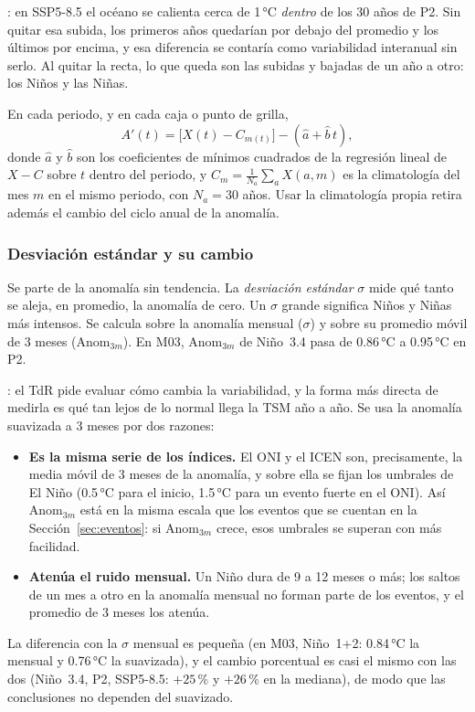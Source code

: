 \documentclass[11pt,a4paper]{article}
\begin{document}
: en SSP5-8.5 el océano se calienta cerca de 1\,°C \emph{dentro} de los 30 años de P2.
Sin quitar esa subida, los primeros años quedarían por debajo del promedio y los últimos por encima, y esa diferencia se contaría como variabilidad interanual sin serlo.
Al quitar la recta, lo que queda son las subidas y bajadas de un año a otro: los Niños y las Niñas.

En cada periodo, y en cada caja o punto de grilla,
\begin{equation}
\label{eq:anom_det}
A'(t) = \big[X(t) - C_{m(t)}\big] - (\hat a + \hat b\,t),
\end{equation}
donde $\hat a$ y $\hat b$ son los coeficientes de mínimos cuadrados de la regresión lineal de $X - C$ sobre $t$ dentro del periodo, y $C_m = \tfrac{1}{N_a}\sum_a X(a,m)$ es la climatología del mes $m$ en el mismo periodo, con $N_a = 30$ años.
Usar la climatología propia retira además el cambio del ciclo anual de la anomalía.

\subsubsection{Desviación estándar y su cambio}

Se parte de la anomalía sin tendencia.
La \emph{desviación estándar} $\sigma$ mide qué tanto se aleja, en promedio, la anomalía de cero.
Un $\sigma$ grande significa Niños y Niñas más intensos.
Se calcula sobre la anomalía mensual ($\sigma$) y sobre su promedio móvil de 3 meses ($\mathrm{Anom}_{3m}$).
En M03, $\mathrm{Anom}_{3m}$ de Niño~3.4 pasa de 0.86\,°C a 0.95\,°C en P2.

: el TdR pide evaluar cómo cambia la variabilidad, y la forma más directa de medirla es qué tan lejos de lo normal llega la TSM año a año.
Se usa la anomalía suavizada a 3 meses por dos razones:
\begin{itemize}[nosep,leftmargin=*]
\item \textbf{Es la misma serie de los índices.} El ONI y el ICEN son, precisamente, la media móvil de 3 meses de la anomalía, y sobre ella se fijan los umbrales de El Niño (0.5\,°C para el inicio, 1.5\,°C para un evento fuerte en el ONI).
Así $\mathrm{Anom}_{3m}$ está en la misma escala que los eventos que se cuentan en la Sección~\ref{sec:eventos}: si $\mathrm{Anom}_{3m}$ crece, esos umbrales se superan con más facilidad.
\item \textbf{Atenúa el ruido mensual.} Un Niño dura de 9 a 12 meses o más; los saltos de un mes a otro en la anomalía mensual no forman parte de los eventos, y el promedio de 3 meses los atenúa.
\end{itemize}
La diferencia con la $\sigma$ mensual es pequeña (en M03, Niño~1+2: 0.84\,°C la mensual y 0.76\,°C la suavizada), y el cambio porcentual es casi el mismo con las dos (Niño~3.4, P2, SSP5-8.5: $+25$\,\% y $+26$\,\% en la mediana), de modo que las conclusiones no dependen del suavizado.
\end{document}
